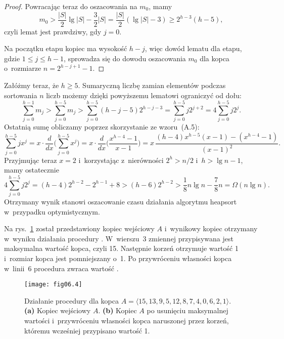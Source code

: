\begin{proof}
Powracając teraz do oszacowania na $m_0$, mamy
\[
    m_0 > \frac{|S|}{2}\lg|S|-\frac{3}{2}|S| = \frac{|S|}{2}(\lg|S|-3) \ge 2^{h-3}(h-5),
\]
czyli lemat jest prawdziwy, gdy $j=0$.

Na początku  etapu kopiec ma wysokość $h-j$, więc dowód lematu dla  etapu, gdzie $1\le j\le h-1$, sprowadza się do dowodu oszacowania $m_0$ dla kopca o~rozmiarze $n=2^{h-j+1}-1$.
\end{proof}

Załóżmy teraz, że $h\ge5$. Sumaryczną liczbę zamian elementów podczas sortowania $n$ liczb możemy dzięki powyższemu lematowi ograniczyć od dołu:
\[
    \sum_{j=0}^{h-1}m_j > \sum_{j=0}^{h-5}m_j > \sum_{j=0}^{h-5}(h-j-5)2^{h-j-3} = \sum_{j=0}^{h-5}j2^{j+2} = 4\sum_{j=0}^{h-5}j2^j.
\]
Ostatnią sumę obliczamy poprzez skorzystanie ze wzoru~(A.5):
\[
    \sum_{j=0}^{h-5}jx^j = x\cdot\frac{d}{dx}\biggl(\sum_{j=0}^{h-5}x^j\biggr) = x\cdot\frac{d}{dx}\biggl(\frac{x^{h-4}-1}{x-1}\biggr) = x\,\frac{(h-4)x^{h-5}(x-1)-(x^{h-4}-1)}{(x-1)^2}.
\]
Przyjmując teraz $x=2$ i~korzystając z~nierówności $2^h>n/2$ i~$h>\lg n-1$, mamy ostatecznie
\[
    4\sum_{j=0}^{h-5}j2^j = (h-4)2^{h-2}-2^{h-1}+8 > (h-6)2^{h-2} > \frac{1}{8}n\lg n-\frac{7}{8}n = \Omega(n\lg n).
\]
Otrzymany wynik stanowi oszacowanie czasu działania algorytmu heapsort w~przypadku optymistycznym.


\exercise %
Na rys.~\ref{fig:6.5-1} został przedstawiony kopiec wejściowy $A$ i~wynikowy kopiec otrzymany w~wyniku działania procedury . W~wierszu~3 zmiennej  przypisywana jest maksymalna wartość kopca, czyli 15. Następnie korzeń otrzymuje wartość 1 i~rozmiar kopca jest pomniejszany o~1. Po przywróceniu własności kopca w~linii~6 procedura zwraca wartość .
\begin{figure}[ht]
	\begin{center}
		\texttt{[image: fig06.4]}
	\end{center}
	\caption{Działanie procedury  dla kopca $A=\langle15,13,9,5,12,8,7,4,0,6,2,1\rangle$. {\sffamily\bfseries(a)} Kopiec wejściowy $A$. {\sffamily\bfseries(b)} Kopiec $A$ po usunięciu maksymalnej wartości i~przywróceniu własności kopca naruszonej przez korzeń, któremu wcześniej przypisano wartość 1.} \label{fig:6.5-1}
\end{figure}

